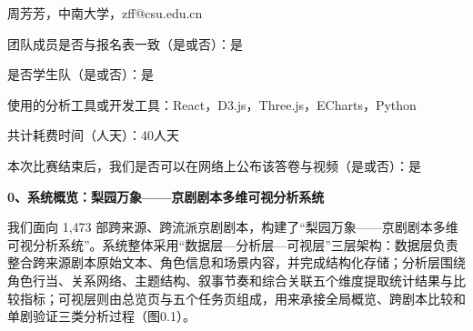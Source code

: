 \documentclass[12pt, a4paper]{article}
\begin{document}
\vspace{16pt}
{\fontsize{13bp}{19bp}\heiti \phantom{团队成员：}周芳芳，中南大学，zff@csu.edu.cn}

\vspace{28pt}

{\fontsize{13bp}{19bp}\heiti 团队成员是否与报名表一致（是或否）：是}

\vspace{28pt}

{\fontsize{13bp}{19bp}\heiti 是否学生队（是或否）：是}

\vspace{28pt}

{\fontsize{13bp}{19bp}\heiti 使用的分析工具或开发工具：React，D3.js，Three.js，ECharts，Python}

\vspace{28pt}

{\fontsize{13bp}{19bp}\heiti 共计耗费时间（人天）：40人天}

\vspace{28pt}

{\fontsize{13bp}{19bp}\heiti 本次比赛结束后，我们是否可以在网络上公布该答卷与视频（是或否）：是}

\vspace{2.0cm}


\newpage
{}
\setcounter{page}{1}
\setlength{\parindent}{2em}


{\fontsize{14bp}{22bp}\heiti\bfseries 0、系统概览：梨园万象——京剧剧本多维可视分析系统}


\vspace{3pt}

{\fontsize{12bp}{20bp}\kaishu
我们面向 1{,}473 部跨来源、跨流派京剧剧本，构建了“梨园万象——京剧剧本多维可视分析系统”。系统整体采用“数据层—分析层—可视层”三层架构：数据层负责整合跨来源剧本原始文本、角色信息和场景内容，并完成结构化存储；分析层围绕角色行当、关系网络、主题结构、叙事节奏和综合关联五个维度提取统计结果与比较指标；可视层则由总览页与五个任务页组成，用来承接全局概览、跨剧本比较和单剧验证三类分析过程（图0.1）。
}
\end{document}

